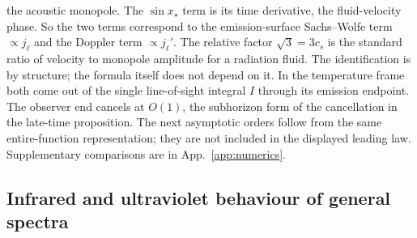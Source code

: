 \documentclass[11pt]{article}
\theoremstyle{definition}
\theoremstyle{remark}
\begin{document}
the acoustic monopole. The $\sin x_\star$ term is its time derivative, the fluid-velocity
phase. So the two terms correspond to the emission-surface Sachs--Wolfe term $\propto j_\ell$
and the Doppler term $\propto j_\ell'$. The relative factor $\sqrt3=3c_s$ is the standard ratio
of velocity to monopole amplitude for a radiation fluid. The identification is by
structure; the formula itself does not depend on it. In the temperature frame both come out of the
single line-of-sight integral $I$ through its emission endpoint. The observer end cancels at
$O(1)$, the subhorizon form of the cancellation in the late-time proposition. The next asymptotic orders follow from the same entire-function representation;
they are not included in the displayed leading law. Supplementary comparisons are in
App.~\ref{app:numerics}.

\subsection{Infrared and ultraviolet behaviour of general spectra}
\end{document}
